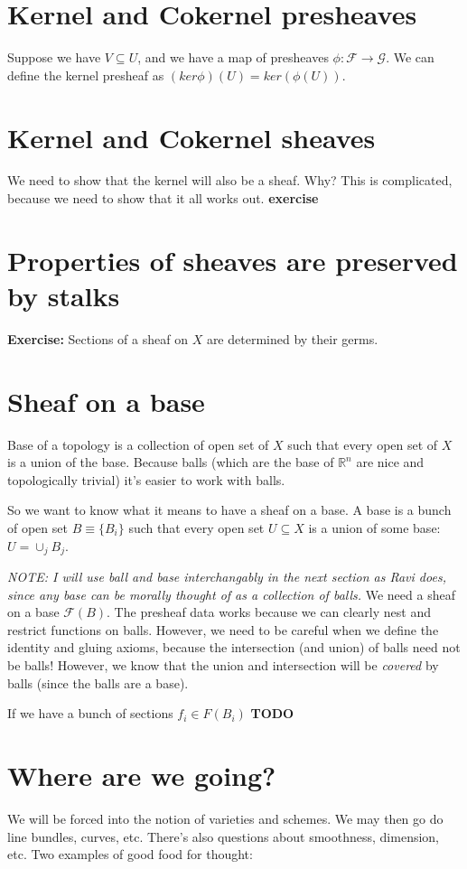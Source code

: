 \documentclass{book}
\newcommand{\F}{\ensuremath{\mathcal{F}}}
\newcommand{\G}{\ensuremath{\mathcal{G}}}
\theoremstyle{definition}
\begin{document}
\section{Kernel and Cokernel presheaves}
Suppose we have $V \subseteq U$, and we have a map of presheaves $\phi: \F \rightarrow \G$.
We can define the kernel presheaf as $(ker \phi)(U) = ker(\phi(U))$.

\section{Kernel and Cokernel sheaves}
We need to show that the kernel will also be a sheaf. Why? This is complicated,
because we need to show that it all works out. \textbf{exercise}

\section{Properties of sheaves are preserved by stalks}
\textbf{Exercise:} Sections of a sheaf on $X$ are determined by their germs.

\section{Sheaf on a base}
Base of a topology is a collection of open set of $X$ such that every open set
of $X$  is a union of the base. Because balls (which are the base of $\mathbb R^n$
are nice and topologically trivial) it's easier to work with balls.

So we want to know what it means to have a sheaf on a base. A base is a bunch
of open set $B \equiv \{ B_i \}$ such that every open set $U \subseteq X$
is a union of some base: $U = \cup_j B_j$. 

\emph{NOTE: I will use ball and base interchangably in the next section as Ravi does, 
since any base can be morally thought of as a collection of balls.}
We need a  sheaf on a base $\F(B)$. The presheaf data works because we can
clearly nest and restrict functions on balls. 
However, we need to be careful when we define the identity and gluing axioms,
because the intersection (and union) of balls need not be balls! However,
we know that the union and intersection will be \emph{covered} by balls (since
the balls are a base).

If we have a bunch of sections $f_i \in F(B_i)$ \textbf{TODO}

\section{Where are we going?}
We will be forced into the notion of varieties and schemes. We may then
go do line bundles, curves, etc. There's also questions about smoothness, dimension,
etc. Two examples of good food for thought:
\end{document}
